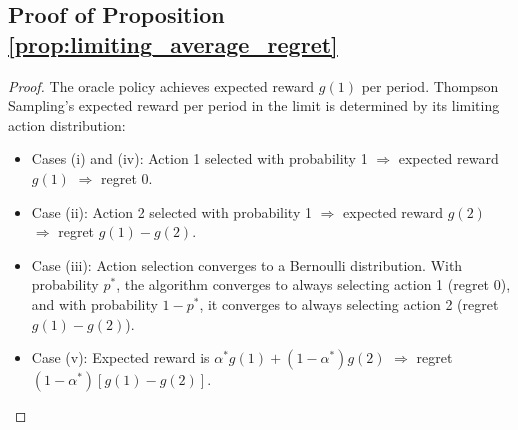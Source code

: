 \documentclass[12pt]{article}
\begin{document}
\subsection{Proof of Proposition \ref{prop:limiting_average_regret}}
\begin{proof}
The oracle policy achieves expected reward $g(1)$ per period. Thompson Sampling's expected reward per period in the limit is determined by its limiting action distribution:
\begin{itemize}
    \item Cases (i) and (iv): Action 1 selected with probability 1 $\Rightarrow$ expected reward $g(1)$ $\Rightarrow$ regret 0.
    \item Case (ii): Action 2 selected with probability 1 $\Rightarrow$ expected reward $g(2)$ $\Rightarrow$ regret $g(1) - g(2)$.
    \item Case (iii): Action selection converges to a Bernoulli distribution. With probability $p^*$, the algorithm converges to always selecting action 1 (regret 0), and with probability $1-p^*$, it converges to always selecting action 2 (regret $g(1) - g(2)$).
    \item Case (v): Expected reward is $\alpha^* g(1) + (1-\alpha^*) g(2)$ $\Rightarrow$ regret $(1-\alpha^*)[g(1) - g(2)]$.
\end{itemize}
\end{proof}
\end{document}
